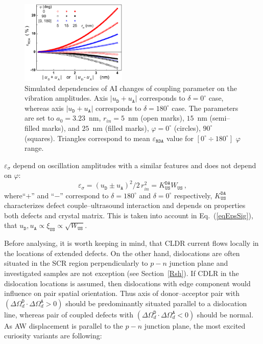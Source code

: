 \documentclass[aip,jap, amsmath,amssymb,reprint]{revtex4-1}
\begin{document}
\begin{figure}
\includegraphics[width=0.45\textwidth]{olikhFig5}%
\caption{\label{fig_Erda}
Simulated dependencies of AI changes of coupling parameter on the vibration amplitudes.
Axis $|u_\mathtt{D}+u_\mathtt{A}|$ corresponds to $\delta=0^\circ$ case, whereas axis $|u_\mathtt{D}+u_\mathtt{A}|$ corresponds to $\delta=180^\circ$ case.
The parameters are set to $a_0=3.23$~nm,
$r_{in}=5$~nm (open marks), $15$~nm (semi--filled marks), and $25$~nm (filled marks),
$\varphi=0^\circ$ (circles), $90^\circ$ (squares).
Triangles correspond to mean $\varepsilon_{\mathtt{RDA}}$ value for $[0^\circ\div 180^\circ]$ $\varphi$ range.
}%
\end{figure}

$\varepsilon_{\sigma}$ depend on oscillation amplitudes with a similar features and
does not depend on $\varphi$:
\begin{equation}
\label{eqEpsSig}
\varepsilon_{\sigma}=(u_\mathtt{D}\pm u_\mathtt{A})^2/2\,r_{in}^2=K_\mathtt{US}^\mathtt{DA}W_{\mathtt{US}}\,,
\end{equation}
where``$+$'' and ``$-$'' correspond to $\delta=180^\circ$ and $\delta=0^\circ$ respectively,
$K_\mathtt{US}^\mathtt{DA}$ characterizes defect couple--ultrasound interaction and depends on properties both defects and crystal matrix.
This is taken into account in Eq.~(\ref{eqEpsSig}), that $u_\mathtt{D},u_\mathtt{A}\propto \xi_\mathtt{US}\propto\sqrt{W_\mathtt{US}}$.

Before analysing, it is worth keeping in mind, that
CLDR current flows locally in the locations of extended defects\cite{CDLR:JAP,CDLR:SSP}.
On the other hand, dislocations are often situated in the SCR region perpendicularly to $p-n$ junction plane
and investigated samples are not exception (see Section~\ref{Rsh}).
If CDLR in the dislocation locations is assumed, then dislocations with edge component would influence on pair spatial orientation.
Thus axis of donor--acceptor pair with $(\Delta\Omega_d^\mathtt{D}\cdot\Delta\Omega_d^\mathtt{A}>0)$  should be predominantly situated parallel to a dislocation line,
whereas pair of coupled defects with $(\Delta\Omega_d^\mathtt{D}\cdot\Delta\Omega_d^\mathtt{A}<0)$ should be normal.
As AW displacement is parallel to the $p-n$ junction plane,
the most excited curiosity variants are following:
\end{document}
